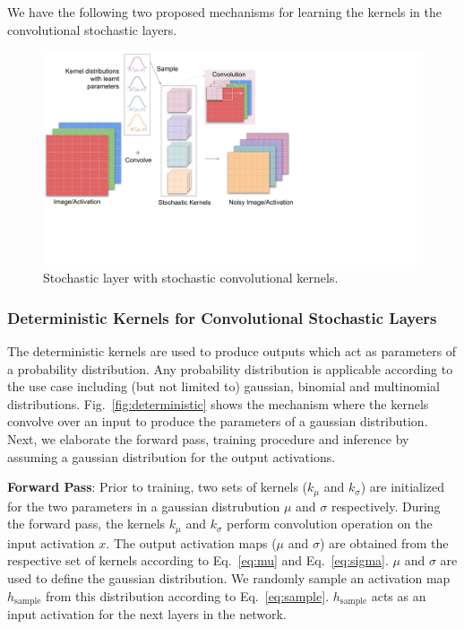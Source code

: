\documentclass[12pt, letterpaper]{article}
\begin{document}
We have the following two proposed mechanisms for learning the kernels in the convolutional stochastic layers.

\begin{figure}[h!]
    \centering
    \includegraphics[width=\textwidth, trim={0 3cm 8.5cm 0}, clip]{stochastic(1).pdf}
    \caption{Stochastic layer with stochastic convolutional kernels.}
    \label{fig:stochastic}
\end{figure}
\subsubsection{Deterministic Kernels for Convolutional Stochastic Layers}
The deterministic kernels are used to produce outputs which act as parameters of a probability distribution. 
Any probability distribution is applicable according to the use case including (but not limited to) gaussian, binomial and multinomial distributions.  
Fig.~\ref{fig:deterministic} shows the mechanism where the kernels convolve over an input to produce the parameters of a gaussian distribution. 
Next, we elaborate the forward pass, training procedure and inference by assuming a gaussian distribution for the output activations.

\textbf{Forward Pass}: Prior to training, two sets of kernels ($k_\mu$ and $k_\sigma$) are initialized for the two parameters in a gaussian distrubution $\mu$ and $\sigma$ respectively. During the forward pass, the kernels $k_\mu$ and $k_\sigma$ perform convolution operation on the input activation $x$. The output activation maps ($\mu$ and $\sigma$) are obtained from the respective set of kernels according to Eq.~\eqref{eq:mu} and Eq.~\eqref{eq:sigma}. $\mu$ and $\sigma$ are used to define the gaussian distribution. We randomly sample an activation map  $h_\mathrm{sample}$ from this distribution according to Eq.~\eqref{eq:sample}. $h_\mathrm{sample}$ acts as an input activation for the next layers in the network. 
\end{document}
